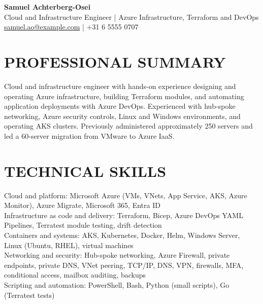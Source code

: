 \documentclass[11pt,a4paper]{article}
\begin{document}
\begin{center}
{\LARGE\bfseries\color{primarycolor} Samuel Achterberg-Osei}\\[0.25em]
{\large Cloud and Infrastructure Engineer | Azure Infrastructure, Terraform and DevOps}\\[0.2em]
\href{mailto:samuel.ao@example.com}{samuel.ao@example.com} | +31 6 5555 0707
\end{center}

\section*{PROFESSIONAL SUMMARY}
Cloud and infrastructure engineer with hands-on experience designing and operating Azure infrastructure, building Terraform modules, and automating application deployments with Azure DevOps. Experienced with hub-spoke networking, Azure security controls, Linux and Windows environments, and operating AKS clusters. Previously administered approximately 250 servers and led a 60-server migration from VMware to Azure IaaS.

\section*{TECHNICAL SKILLS}
Cloud and platform: Microsoft Azure (VMs, VNets, App Service, AKS, Azure Monitor), Azure Migrate, Microsoft 365, Entra ID\\
Infrastructure as code and delivery: Terraform, Bicep, Azure DevOps YAML Pipelines, Terratest module testing, drift detection\\
Containers and systems: AKS, Kubernetes, Docker, Helm, Windows Server, Linux (Ubuntu, RHEL), virtual machines\\
Networking and security: Hub-spoke networking, Azure Firewall, private endpoints, private DNS, VNet peering, TCP/IP, DNS, VPN, firewalls, MFA, conditional access, mailbox auditing, backups\\
Scripting and automation: PowerShell, Bash, Python (small scripts), Go (Terratest tests)
\end{document}
